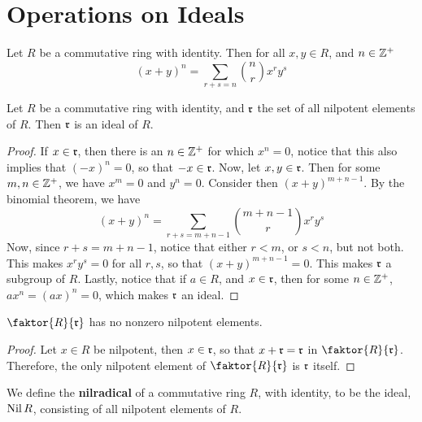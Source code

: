 \section{Operations on Ideals}
\label{section_5.5}

\begin{theorem}\label{5.5.1}
    Let $R$ be a commutative ring with identity. Then for all  $x,y \in R$, and
     $n \in \mathbb{Z}^+$
     \begin{equation*}
         (x+y)^n=\sum_{r+s=n}{{n \choose r}x^ry^s}
     \end{equation*}
\end{theorem}

\begin{proposition}\label{proposition_5.5.2}
    Let $R$ be a commutative ring with identity, and $\mathfrak{r}$ the set of all
    nilpotent elements of $R$. Then $\mathfrak{r}$ is an ideal of $R$.
\end{proposition}
\begin{proof}
    If $x \in \mathfrak{r}$, then there is an  $n \in \mathbb{Z}^+$ for which  $x^n=0$, notice
    that this also implies that  $(-x)^n=0$, so that $-x \in \mathfrak{r}$. Now, let $x,y
    \in \mathfrak{r}$. Then for some $m,n \in \mathbb{Z}^+$, we have $x^m=0$ and $y^n=0$.
    Consider then $(x+y)^{m+n-1}$. By the binomial theorem, we have
     \begin{equation*}
         (x+y)^n=\sum_{r+s=m+n-1}{{m+n-1 \choose r}x^ry^s}
     \end{equation*}
     Now, since $r+s=m+n-1$, notice that either  $r<m$, or  $s<n$, but not both.
     This makes  $x^ry^s=0$ for all  $r,s$, so that  $(x+y)^{m+n-1}=0$. This
     makes $\mathfrak{r}$ a subgroup of  $R$. Lastly, notice that if  $a \in R$, and  $x
     \in \mathfrak{r}$, then for some  $n \in \mathbb{Z}^+$,  $ax^n=(ax)^n=0$, which makes $\mathfrak{r}$
     an ideal.
\end{proof}
\begin{corollary}
    $\faktor{R}{\rf}$ has no nonzero nilpotent elements.
\end{corollary}
\begin{proof}
    Let $x \in R$ be nilpotent, then $x \in \mathfrak{r}$, so that $x+\mathfrak{r}=\mathfrak{r}$ in
    $\faktor{R}{\rf}$. Therefore, the only nilpotent element of
    $\faktor{R}{\rf}$ is $\mathfrak{r}$ itself.
\end{proof}

\begin{definition}
    We define the \textbf{nilradical} of a commutative ring $R$, with identity,
    to be the ideal, $\operatorname{Nil}{R}$, consisting of all nilpotent elements of $R$.
\end{definition}


